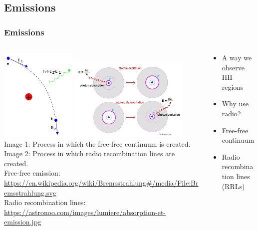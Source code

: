 \documentclass[aspectratio=169,compress]{beamer}
\newcommand\teeny{\fontsize{3pt}{3.6pt}\selectfont}
\begin{document}
\subsection{Emissions}
\begin{frame}
  \frametitle{Emissions}
  \begin{columns}
    \begin{column}{0.5\textwidth}
      \includegraphics[width=0.35\textwidth]{figures/bremms.png}
      \includegraphics[width=0.55\textwidth]{figures/rrl.jpg}\\
      {\teeny Image 1: Process in which the free-free continuum is created.}
      {\teeny\\ Image 2: Process in which radio recombination lines are created.}
      {\teeny\\ Free-free emission: \url{https://en.wikipedia.org/wiki/Bremsstrahlung\#/media/File:Bremsstrahlung.svg}}
      {\teeny\\ Radio recombination lines: \url{https://astronoo.com/images/lumiere/absorption-et-emission.jpg}}
    \end{column}
    \begin{column}{0.5\textwidth}
      \begin{itemize}
        \item A way we observe HII regions
        \item Why use radio?
        \item Free-free continuum
        \item Radio recombination lines (RRLs)
      \end{itemize}
    \end{column}
  \end{columns}
\end{frame}
\end{document}
